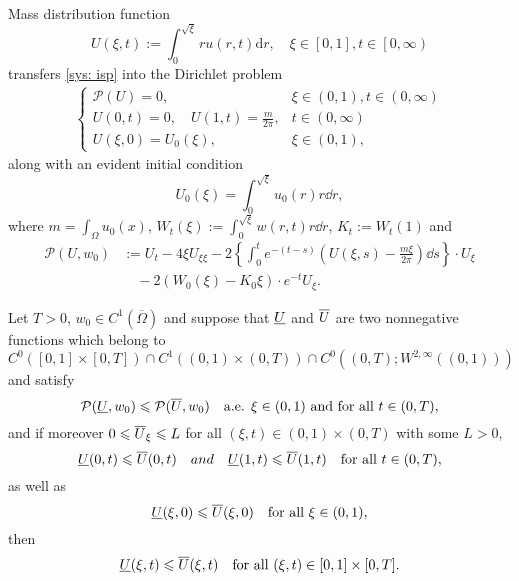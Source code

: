 \begin{frame}{Mass distribution function}
\begin{equation}\label{eq: mass distribution function}
	U(\xi, t):=\int_{0}^{\sqrt\xi} r u(r, t) \mathrm{d} r, \quad \xi \in\left[0, 1\right], t \in\left[0, \infty\right)
\end{equation}
transfers \eqref{sys: isp}  into the Dirichlet problem
\begin{align}\label{sys: partial mass pde}
    \begin{cases}
		\mathcal{P}(U) = 0, & \xi \in(0, 1), t \in\left(0, \infty\right)\\
		U(0, t)=0, \quad U\left(1, t\right)=\frac{m}{2\pi}, & t \in\left(0, \infty\right)\\
		U(\xi, 0) = U_0(\xi), & \xi\in(0, 1), 
    \end{cases}
\end{align}
along with an evident initial condition
\begin{equation}\label{partial mass initial data}
	U_0(\xi) = \int_0^{\sqrt\xi}u_0(r)r\dd r,
\end{equation}
where $m = \int_\Omega u_0(x)$, $W_t(\xi):=\int_0^{\sqrt\xi}w(r, t) r\dd {r}$, $K_t:= W_t(1)$ and
\begin{align*}
\mathcal{P}(U, w_0) &:= U_t - 4 \xi U_{\xi \xi} - 2\left\{\int_0^t e^{-(t-s)}\left(U(\xi, s)-\frac{m\xi}{2 \pi}\right) \dd {s}\right\} \cdot U_{\xi} \\
&\quad - 2(W_0(\xi)-K_0 \xi) \cdot e^{-t} U_{\xi}.
\end{align*}
\end{frame}

\begin{frame}
\begin{lemma}
	Let $T>0$, $w_0\in C^1(\overline{\Omega})$ and suppose that $\underline{U}$ and $\overline{U}$ are two nonnegative functions which belong to
\[
    C^0([0, 1]\times [0, T])\cap
    C^1((0, 1)\times(0, T))\cap
    C^0((0, T); W^{2,\infty}((0,1)))
\]
and satisfy
\begin{equation*}
		\mathcal{P}(\underline{U}, w_0) \leqslant \mathcal{P}(\overline{U}, w_0)\quad\text{a.e. } \xi\in(0,1) \text{ and for all } t \in(0, T),
\end{equation*}
and if moreover
\(
  0\leqslant \overline{U}_\xi\leqslant L\) for all  \((\xi,t)\in(0,1)\times(0,T)\)
with some $L>0$,
\begin{equation*}
	\underline{U}(0, t) \leqslant \overline{U}(0, t) \quad{and}\quad\underline{U}(1, t) \leqslant \overline{U}(1, t) \quad\text{for all } t \in(0, T),
\end{equation*}
as well as
\begin{equation*}
	\underline{U}(\xi, 0)\leqslant \overline{U}(\xi, 0) \quad\text{for all }  \xi\in (0, 1),
\end{equation*}
then
\begin{equation*}
	\underline{U} (\xi, t) \leqslant \overline{U} (\xi, t) \quad\text{for all } (\xi, t) \in[0, 1]\times [0, T].
\end{equation*}
\end{lemma}
\end{frame}



